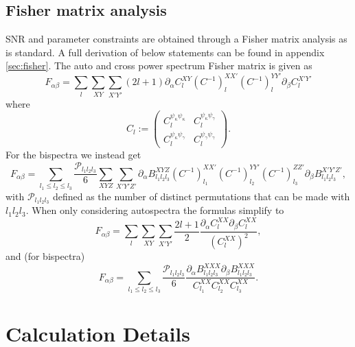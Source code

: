 \documentclass[11pt]{article} %
\begin{document}
\subsection{Fisher matrix analysis}
SNR and parameter constraints are obtained through a Fisher matrix analysis as is standard. A full derivation of below statements can be found in appendix \ref{sec:fisher}. The auto and cross power spectrum Fisher matrix is given as
\begin{equation*}
    F_{\alpha\beta} = \sum_{l} \sum_{XY}\sum_{X'Y'}(2l+1)\partial_\alpha C_l^{XY} (C^{-1})_l^{XX'}(C^{-1})_l^{YY'} \partial_\beta C^{X'Y'}_l
\end{equation*}
where
\begin{equation*}
    C_{l} := \begin{pmatrix}
        C^{\psi_\kappa\psi_\kappa}_l & C^{\psi_\kappa\psi_\gamma}_l \\
        C^{\psi_\kappa\psi_\gamma}_l & C^{\psi_\gamma\psi_\gamma}_l
    \end{pmatrix}.
\end{equation*}
For the bispectra we instead get 
\begin{equation*}
    F_{\alpha\beta} = \sum_{l_1 \leq l_2 \leq l_3} \frac{\mathcal P _{l_1l_2l_3}}{6}
    \sum_{XYZ}\sum_{X'Y'Z'} 
    \partial_\alpha B^{X Y Z}_{l_1 l_2 l_3} 
    (C^{-1})^{X X'}_{l_1}
    (C^{-1})^{Y Y'}_{l_2}
    (C^{-1})^{Z Z'}_{l_3}
    \partial_\beta B^{X' Y' Z'}_{l_1 l_2 l_3},
\end{equation*}
with $\mathcal P_{l_1l_2l_3}$ defined as the number of distinct permutations that can be made with $l_1l_2l_3$. When only considering autospectra the formulas simplify to
\begin{equation*}
    F_{\alpha\beta} = \sum_{l} \sum_{XY}\sum_{X'Y'}\frac{2l+1}{2}\frac{\partial_{\alpha}C_l^{XX} \partial_\beta C^{XX}_l}{(C_l^{XX})^2},
\end{equation*}
and (for bispectra)
\begin{equation*}
    F_{\alpha\beta} = \sum_{l_1 \leq l_2 \leq l_3} \frac{\mathcal P _{l_1l_2l_3}}{6}
    \frac{\partial_\alpha B^{X X X}_{l_1 l_2 l_3} 
    \partial_\beta B^{XXX}_{l_1 l_2 l_3}}{C^{XX}_{l_1}C^{XX}_{l_2}C^{XX}_{l_3}}.
\end{equation*}



\section{Calculation Details}\label{sec:calcdetails}
\end{document}
